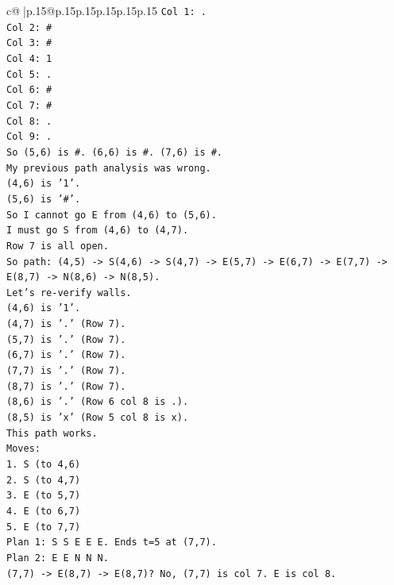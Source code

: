 \documentclass{article}
\begin{document}
{\begin{supertabular}{c@{$\;$}|p{.15\linewidth}@{}p{.15\linewidth}p{.15\linewidth}p{.15\linewidth}p{.15\linewidth}p{.15\linewidth}}
{{{\texttt{Col 1: .} \\
\texttt{Col 2: \#} \\
\texttt{Col 3: \#} \\
\texttt{Col 4: 1} \\
\texttt{Col 5: .} \\
\texttt{Col 6: \#} \\
\texttt{Col 7: \#} \\
\texttt{Col 8: .} \\
\texttt{Col 9: .} \\
\texttt{So (5,6) is \#. (6,6) is \#. (7,6) is \#.} \\
\texttt{My previous path analysis was wrong.} \\
\texttt{(4,6) is '1'.} \\
\texttt{(5,6) is '\#'.} \\
\texttt{So I cannot go E from (4,6) to (5,6).} \\
\texttt{I must go S from (4,6) to (4,7).} \\
\texttt{Row 7 is all open.} \\
\texttt{So path: (4,5) {-}> S(4,6) {-}> S(4,7) {-}> E(5,7) {-}> E(6,7) {-}> E(7,7) {-}> E(8,7) {-}> N(8,6) {-}> N(8,5).} \\
\texttt{Let's re{-}verify walls.} \\
\texttt{(4,6) is '1'.} \\
\texttt{(4,7) is '.' (Row 7).} \\
\texttt{(5,7) is '.' (Row 7).} \\
\texttt{(6,7) is '.' (Row 7).} \\
\texttt{(7,7) is '.' (Row 7).} \\
\texttt{(8,7) is '.' (Row 7).} \\
\texttt{(8,6) is '.' (Row 6 col 8 is .).} \\
\texttt{(8,5) is 'x' (Row 5 col 8 is x).} \\
\texttt{This path works.} \\
\texttt{Moves:} \\
\texttt{1. S (to 4,6)} \\
\texttt{2. S (to 4,7)} \\
\texttt{3. E (to 5,7)} \\
\texttt{4. E (to 6,7)} \\
\texttt{5. E (to 7,7)} \\
\texttt{Plan 1: S S E E E. Ends t=5 at (7,7).} \\
\texttt{Plan 2: E E N N N.} \\
\texttt{(7,7) {-}> E(8,7) {-}> E(8,7)? No, (7,7) is col 7. E is col 8.} \\
}}}
\end{supertabular}}
\end{document}
